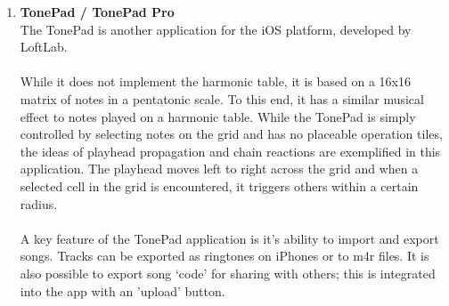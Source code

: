\documentclass[10pt,a4paper]{article}
\begin{document}
\begin{enumerate}
\item \textbf{TonePad / TonePad Pro}\\
The TonePad is another application for the iOS platform, developed by LoftLab.\cite{tonepaditunes} \\
\\
While it does not implement the harmonic table, it is based on a 16x16 matrix of notes in a pentatonic scale. To this end, it has a similar musical effect to notes played on a harmonic table. While the TonePad is simply controlled by selecting notes on the grid and has no placeable operation tiles, the ideas of playhead propagation and chain reactions are exemplified in this application. The playhead moves left to right across the grid and when a selected cell in the grid is encountered, it triggers others within a certain radius. \\
\\
A key feature of the TonePad application is it's ability to import and export songs. Tracks can be exported as ringtones on iPhones or to m4r files. It is also possible to export song `code' for sharing with others; this is integrated into the app with an 'upload' button. 
\end{enumerate}
\end{document}
